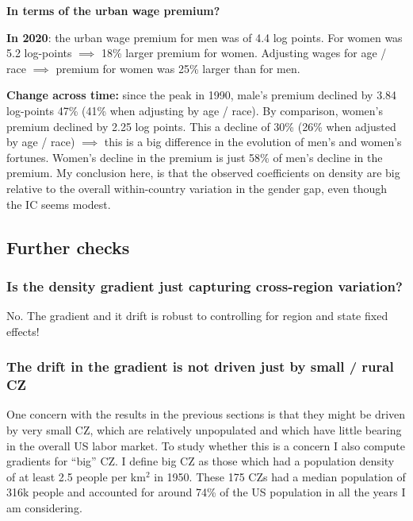 \eitem
\item \textbf{In terms of the urban wage premium?}
\bitem 
	\item \textbf{In 2020}: the urban wage premium for men was of 4.4 log points. For women was 5.2 log-points $\implies$ 18\% larger premium for women. Adjusting wages for age / race $\implies$ premium for women was 25\% larger than for men.
	\item \textbf{Change across time:} since the peak in 1990, male's premium declined by 3.84 log-points 47\% (41\% when adjusting by age / race). By comparison, women's premium declined by 2.25 log points. This a decline of 30\% (26\% when adjusted by age / race) $\implies$ this is a big difference in the evolution of men's and women's fortunes. Women's decline in the premium is just 58\% of men's decline in the premium.
\eitem
My conclusion here, is that the observed coefficients on density are big relative to the overall within-country variation in the gender gap, even though the IC seems modest.
\eitem

\subsection{Further checks}
\subsubsection{Is the density gradient just capturing cross-region variation?} No. The gradient and it drift is robust to controlling for region and state fixed effects!




\subsubsection{The drift in the gradient is not driven just by small / rural CZ}

One concern with the results in the previous sections is that they might be driven by very small CZ, which are relatively unpopulated and which have little bearing in the overall US labor market. To study whether this is a concern I also compute gradients for ``big'' CZ.  I define big CZ as those which had a population density of at least 2.5 people per km$^2$ in 1950. These 175 CZs had a median population of 316k people and accounted for around 74\% of the US population in all the years I am considering. 



